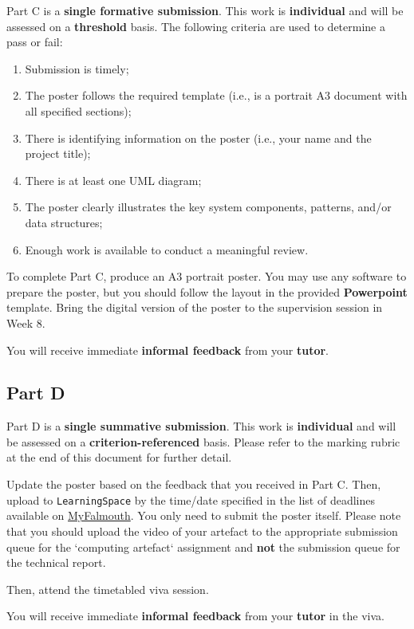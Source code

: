 \documentclass{../../fal_assignment}
\begin{document}
Part C is a \textbf{single formative submission}. This work is \textbf{individual} and will be assessed on a \textbf{threshold} basis.  The following criteria are used to determine a pass or fail:

\begin{enumerate}[label=(\alph*)]
	\item Submission is timely;
	\item The poster follows the required template  (i.e., is a portrait A3 document with all specified sections);
	\item There is identifying information on the poster (i.e., your name and the project title);
	\item There is at least one UML diagram;
	\item The poster clearly illustrates the key system components, patterns, and/or data structures;
	\item Enough work is available to conduct a meaningful review.
\end{enumerate}

To complete Part C, produce an A3 portrait poster. You may use any software to prepare the poster, but you should follow the layout in the provided \textbf{Powerpoint} template.  Bring the digital version of the poster to the supervision session in Week 8.

You will receive immediate \textbf{informal feedback} from your \textbf{tutor}.

\subsection*{Part D}

Part D is a \textbf{single summative submission}. This work is \textbf{individual} and will be assessed on a \textbf{criterion-referenced} basis.  Please refer to the marking rubric at the end of this document for further detail.

Update the poster based on the feedback that you received in Part C. Then, upload to \texttt{LearningSpace} by the time/date specified in the list of deadlines available on \href{http://myfalmouth.falmouth.ac.uk}{MyFalmouth}. You only need to submit the poster itself. Please note that you should upload the video of your artefact to the appropriate submission queue for the `computing artefact` assignment and \textbf{not} the submission queue for the technical report. 

Then, attend the timetabled viva session.

You will receive immediate \textbf{informal feedback} from your \textbf{tutor} in the viva.
\end{document}
